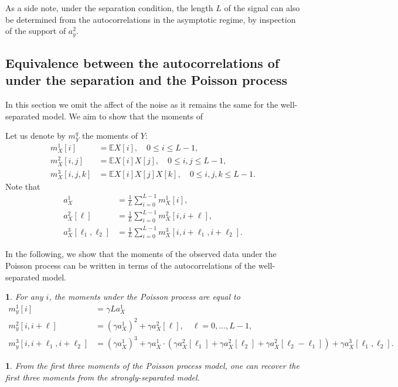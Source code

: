 \documentclass[12pt]{article}
\newcommand{\E}{\mathbb{E}}
\newcommand{\1}{\mathbf{1}}
\newcommand{\TODO}[1]{{\color{red}{[#1]}}}
\theoremstyle{plain}
\theoremstyle{definition}
\theoremstyle{remark}
\theoremstyle{plain}
\theoremstyle{remark}
\theoremstyle{plain}
\newtheorem{corollary}[thm]{\protect\corollaryname}
\theoremstyle{plain}
\theoremstyle{plain}
\newtheorem{proposition}[thm]{\protect\propositionname}
\providecommand{\corollaryname}{Corollary}
\providecommand{\propositionname}{Proposition}
\numberwithin{equation}{section}
\begin{document}
As a side note, under the separation condition, the length $L$ of the signal can also be determined from the autocorrelations in the asymptotic regime, by inspection of the support of $a_y^2$.


\subsection{Equivalence between the autocorrelations of under the separation and the Poisson process \TODO{?}} \label{sec:poisson}

In this section we omit the affect of the noise as it remains the same for the well-separated model. We aim to show that the moments of 

Let us denote by $m_Y^q$ the moments of $Y$:
%
\begin{align}
%
m_X^1[i] &= \E X[i], \quad 0 \le i \le L-1,   \nonumber\\ 
m_X^2[i,j] &= \E X[i] X[j], \quad 0 \le i,j \le L-1, \\ 
m_X^3[i,j,k] &= \E X[i] X[j] X[k], \quad 0 \le i,j,k \le L-1. \nonumber
\end{align}
%
Note that 
\begin{align}
a_X^1 &= \frac{1}{L}\sum_{i=0}^{L-1}m_X^1[i], \nonumber \\
a_X^2[\ell] &= \frac{1}{L}\sum_{i=0}^{L-1}m_X^2[i,i+\ell], \\
a_X^3[\ell_1,\ell_2] &= \frac{1}{L}\sum_{i=0}^{L-1}m_X^3[i,i+\ell_1,i+\ell_2]. \nonumber
\end{align}


In the following,  we show that the moments of the observed data under the Poisson process can be written in terms of the autocorrelations of the well-separated model.

\begin{proposition} \label{prop:poisson}
    For any $i$,  the moments under the Poisson process are equal to 
    \begin{align}
    m_y^1[i] &= \gamma L a_X^1 \nonumber \\
    m_y^2[i,i+\ell] &= (\gamma a_X^1)^2 + \gamma a_X^2[\ell],\quad \ell=0,\ldots,L-1, \\
    m_y^3[i,i+\ell_1,i+\ell_2] &= (\gamma a_X^1)^3 + \gamma a_X^1  \cdot ( \gamma a_X^2[\ell_1] + \gamma a_X^2[\ell_2] + \gamma a_X^2[\ell_2-\ell_1]) + \gamma a_X^3[\ell_1,\ell_2]. \nonumber  
    \end{align}
\end{proposition}


\begin{corollary} \TODO{re-write}
	From the first three moments of the Poisson process model, one can recover the first three moments from the strongly-separated model.
\end{corollary}
\end{document}
